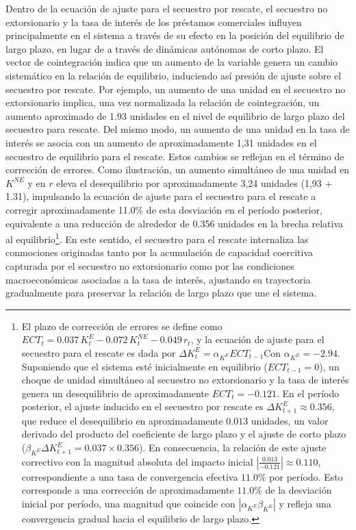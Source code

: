 \documentclass[12pt]{article}
\theoremstyle{definition}
\theoremstyle{remark}
\newcommand{\1}{\mathbf{1}}
\begin{document}
Dentro de la ecuación de ajuste para el secuestro por rescate, el secuestro no extorsionario y la tasa de interés de los préstamos comerciales influyen principalmente en el sistema a través de su efecto en la posición del equilibrio de largo plazo, en lugar de a través de dinámicas autónomas de corto plazo. El vector de cointegración indica que un aumento de la variable genera un cambio sistemático en la relación de equilibrio, induciendo así presión de ajuste sobre el secuestro por rescate. Por ejemplo, un aumento de una unidad en el secuestro no extorsionario implica, una vez normalizada la relación de cointegración, un aumento aproximado de 1.93 unidades en el nivel de equilibrio de largo plazo del secuestro para rescate. Del mismo modo, un aumento de una unidad en la tasa de interés se asocia con un aumento de aproximadamente 1,31 unidades en el secuestro de equilibrio para el rescate. Estos cambios se reflejan en el término de corrección de errores. Como ilustración, un aumento simultáneo de una unidad en \(K^{NE}\) y en \(r\) eleva el desequilibrio por aproximadamente 3,24 unidades (1,93 + 1.31), impulsando la ecuación de ajuste para el secuestro para el rescate a corregir aproximadamente 11.0\% de esta desviación en el período posterior, equivalente a una reducción de alrededor de 0.356 unidades en la brecha relativa al equilibrio\footnote{El plazo de corrección de errores se define como \(ECT_t = 0.037\,K^{E}_t - 0.072\,K^{NE}_t - 0.049\,r_t\), y la ecuación de ajuste para el secuestro para el rescate es dada por \(\Delta K^{E}_t = \alpha_{K^E} ECT_{t-1}\)Con \(\alpha_{K^E} = -2.94\). Suponiendo que el sistema esté inicialmente en equilibrio (\(ECT_{t-1}=0\)), un choque de unidad simultáneo al secuestro no extorsionario y la tasa de interés genera un desequilibrio de aproximadamente \(ECT_t = -0.121\). En el período posterior, el ajuste inducido en el secuestro por rescate es \(\Delta K^{E}_{t+1} \approx 0.356\), que reduce el desequilibrio en aproximadamente $0.013$ unidades, un valor derivado del producto del coeficiente de largo plazo y el ajuste de corto plazo ($\beta_{K^E} \Delta K^{E}_{t+1} = 0.037 \times 0.356$). En consecuencia, la relación de este ajuste correctivo con la magnitud absoluta del impacto inicial $\left| \frac{0.013}{-0.121} \right| \approx 0.110$, correspondiente a una tasa de convergencia efectiva $11.0\%$ por período. Esto corresponde a una corrección de aproximadamente \(11.0\%\) de la desviación inicial por período, una magnitud que coincide con \(|\alpha_{K^E}\beta_{K^E}|\) y refleja una convergencia gradual hacia el equilibrio de largo plazo.}. En este sentido, el secuestro para el rescate internaliza las conmociones originadas tanto por la acumulación de capacidad coercitiva capturada por el secuestro no extorsionario como por las condiciones macroeconómicas asociadas a la tasa de interés, ajustando su trayectoria gradualmente para preservar la relación de largo plazo que une el sistema.
\end{document}
